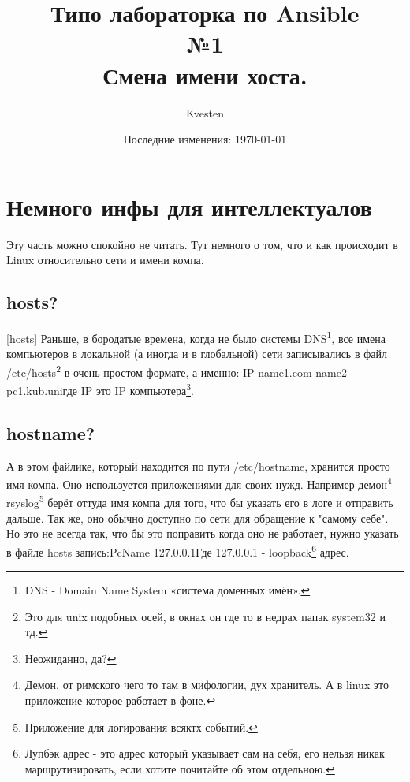 

\title{Типо лабораторка по Ansible\\№1\\Смена имени хоста.}
\author{Kvesten}
\date{Последние изменения: \today}


    \maketitle\newpage
    \tableofcontents\newpage

    \section{Немного инфы для интеллектуалов}
        Эту часть можно спокойно не читать. Тут немного о том, что и как происходит в Linux относительно сети и имени компа.

        \subsection{hosts?}\ref{hosts}
            Раньше, в бородатые времена, когда не было системы DNS\footnote{DNS - Domain Name System «система доменных имён».}, все имена компьютеров в локальной (а иногда и в глобальной) сети записывались в файл /etc/hosts\footnote{Это для unix подобных осей, в окнах он где то в недрах папак system32 и тд.} в очень простом формате, а именно: \newline IP name1.com name2 pc1.kub.uni\newline где IP это IP компьютера\footnote{Неожиданно, да?}.

        \subsection{hostname?}
            А в этом файлике, который находится по пути /etc/hostname, хранится просто имя компа. Оно используется приложениями для своих нужд. Например демон\footnote{Демон, от римского чего то там в мифологии, дух хранитель. А в linux это приложение которое работает в фоне.} rsyslog\footnote{Приложение для логирования всяктх событий.} берёт оттуда имя компа для того, что бы указать его в логе и отправить дальше. Так же, оно обычно доступно по сети для обращение к "самому себе". Но это не всегда так, что бы это поправить когда оно не работает, нужно указать в файле hosts\label{hosts} запись:\newline PcName 127.0.0.1\newline Где 127.0.0.1 - loopback\footnote{Лупбэк адрес - это адрес который указывает сам на себя, его нельзя никак маршрутизировать, если хотите почитайте об этом отдельною.} адрес.

